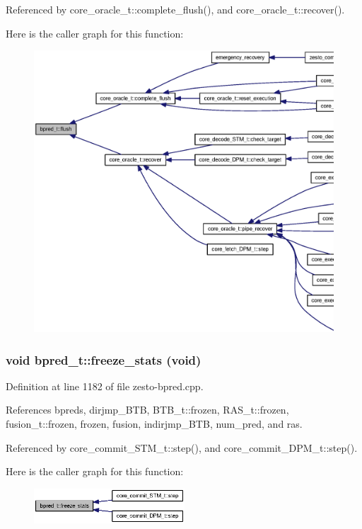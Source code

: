 Referenced by core\_\-oracle\_\-t::complete\_\-flush(), and core\_\-oracle\_\-t::recover().

Here is the caller graph for this function:\nopagebreak
\begin{figure}[H]
\begin{center}
\leavevmode
\includegraphics[width=420pt]{classbpred__t_5e29cd0982fcca98f66db5f4cc11321a_icgraph}
\end{center}
\end{figure}
\subsubsection[{freeze\_\-stats}]{\setlength{\rightskip}{0pt plus 5cm}void bpred\_\-t::freeze\_\-stats (void)}\label{classbpred__t_6ccd38354851e9913ad09445cd5bcd5e}




Definition at line 1182 of file zesto-bpred.cpp.

References bpreds, dirjmp\_\-BTB, BTB\_\-t::frozen, RAS\_\-t::frozen, fusion\_\-t::frozen, frozen, fusion, indirjmp\_\-BTB, num\_\-pred, and ras.

Referenced by core\_\-commit\_\-STM\_\-t::step(), and core\_\-commit\_\-DPM\_\-t::step().

Here is the caller graph for this function:\nopagebreak
\begin{figure}[H]
\begin{center}
\leavevmode
\includegraphics[width=160pt]{classbpred__t_6ccd38354851e9913ad09445cd5bcd5e_icgraph}
\end{center}
\end{figure}
